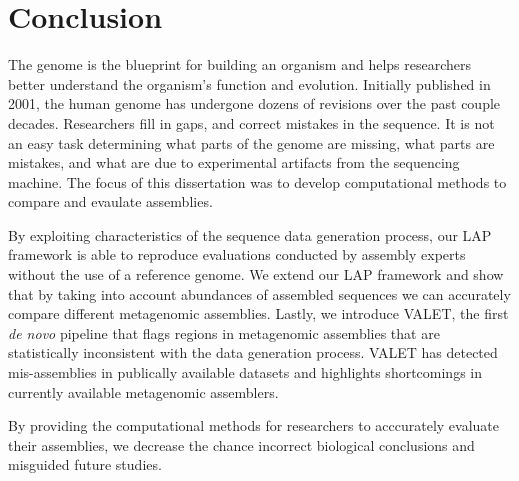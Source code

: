 
\renewcommand{\thechapter}{7}

\chapter{Conclusion}

The genome is the blueprint for building an organism and helps researchers better understand the organism's function and evolution.
Initially published in 2001, the human genome has undergone dozens of revisions over the past couple decades.
Researchers fill in gaps, and correct mistakes in the sequence.
It is not an easy task determining what parts of the genome are missing, what parts are mistakes, and what are due to experimental artifacts from the sequencing machine.
The focus of this dissertation was to develop computational methods to compare and evaulate assemblies.

By exploiting characteristics of the sequence data generation process, our LAP framework is able to reproduce evaluations conducted by assembly experts without the use of a reference genome.
We extend our LAP framework and show that by taking into account abundances of assembled sequences we can accurately compare different metagenomic assemblies.
Lastly, we introduce VALET, the first \emph{de novo} pipeline that flags regions in metagenomic assemblies that are statistically inconsistent with the data generation process.
VALET has detected mis-assemblies in publically available datasets and highlights shortcomings in currently available metagenomic assemblers.

By providing the computational methods for researchers to acccurately evaluate their assemblies, we decrease the chance incorrect biological conclusions and misguided future studies.


